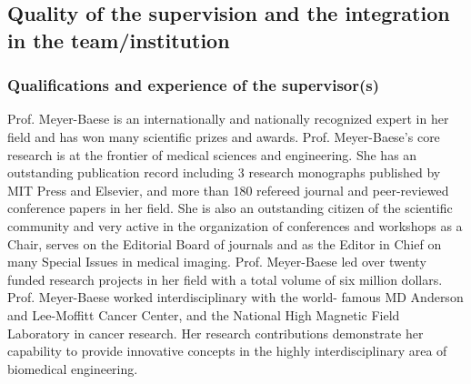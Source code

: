 
 



\subsection{Quality of the supervision and the integration in the team/institution}
\label{sec:supervision}

\subsubsection*{Qualifications and experience of the supervisor(s)}

Prof. Meyer-Baese is an internationally and nationally recognized expert in her field and has won many scientific prizes and awards.
Prof. Meyer-Baese's core research is at the frontier of medical sciences and engineering.
She has an outstanding publication record including 3 research monographs published by MIT Press and Elsevier, and more than 180 refereed journal and peer-reviewed conference papers in her field.
She is also an outstanding citizen of the scientific community and very active in the organization of conferences and workshops as a Chair, serves on the Editorial Board of journals and as the Editor in Chief on many Special Issues in medical imaging.
Prof. Meyer-Baese led over twenty funded research projects in her field with a total volume of six million dollars.
Prof. Meyer-Baese worked interdisciplinary with the world- famous MD Anderson and Lee-Moffitt Cancer Center, and the National High Magnetic Field Laboratory in cancer research.
Her research contributions demonstrate her capability to provide innovative concepts in the highly interdisciplinary area of biomedical engineering.

